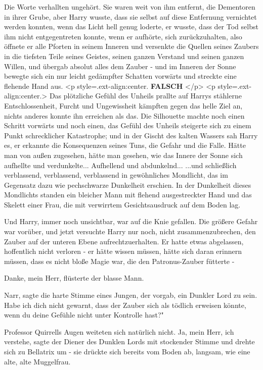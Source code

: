 Die Worte verhallten ungehört. Sie waren weit von ihm entfernt, die Dementoren
in ihrer Grube, aber Harry wusste, dass sie selbst auf diese Entfernung
vernichtet werden konnten, wenn das Licht hell genug loderte, er wusste, dass
der Tod selbst ihm nicht entgegentreten konnte, wenn er aufhörte, sich
zurückzuhalten, also öffnete er alle Pforten in seinem Inneren und versenkte die
Quellen seines Zaubers in die tiefsten Teile seines Geistes, seinen ganzen
Verstand und seinen ganzen Willen, und übergab absolut alles dem Zauber - und im
Inneren der Sonne bewegte sich ein nur leicht gedämpfter Schatten vorwärts und
streckte eine flehende Hand aus. <p style=\grqq{}.ext-align:center\grqq{}.
\textbf{FALSCH} </p> <p style=\grqq{}.ext-align:center\grqq{}.> Das plötzliche
Gefühl des Unheils prallte auf Harrys stählerne Entschlossenheit, Furcht und
Ungewissheit kämpften gegen das helle Ziel an, nichts anderes konnte ihn
erreichen als das. Die Silhouette machte noch einen Schritt vorwärts und noch
einen, das Gefühl des Unheils steigerte sich zu einem Punkt schrecklicher
Katastrophe; und in der Gischt des kalten Wassers sah Harry es, er erkannte die
Konsequenzen seines Tuns, die Gefahr und die Falle. Hätte man von außen
zugesehen, hätte man gesehen, wie das Innere der Sonne sich aufhellte und
verdunkelte... Aufhellend und abdunkelnd... ...und schließlich verblassend,
verblassend, verblassend in gewöhnliches Mondlicht, das im Gegensatz dazu wie
pechschwarze Dunkelheit erschien. In der Dunkelheit dieses Mondlichts standen
ein bleicher Mann mit flehend ausgestreckter Hand und das Skelett einer Frau,
die mit verwirrtem Gesichtsausdruck auf dem Boden lag.

Und Harry, immer noch unsichtbar, war auf die Knie gefallen. Die größere Gefahr
war vorüber, und jetzt versuchte Harry nur noch, nicht zusammenzubrechen, den
Zauber auf der unteren Ebene aufrechtzuerhalten. Er hatte etwas abgelassen,
hoffentlich nicht verloren - er hätte wissen müssen, hätte sich daran erinnern
müssen, dass es nicht bloße Magie war, die den Patronus-Zauber fütterte -

\glqq{}Danke, mein Herr\grqq{}, flüsterte der blasse Mann.

\glqq{}Narr\grqq{}, sagte die harte Stimme eines Jungen, der vorgab, ein Dunkler
Lord zu sein. \glqq{}Habe ich dich nicht gewarnt, dass der Zauber sich als
tödlich erweisen könnte, wenn du deine Gefühle nicht unter Kontrolle hast?"

Professor Quirrells Augen weiteten sich natürlich nicht. \glqq{}Ja, mein Herr,
ich verstehe\grqq{}, sagte der Diener des Dunklen Lords mit stockender Stimme
und drehte sich zu Bellatrix um - sie drückte sich bereits vom Boden ab,
langsam, wie eine alte, alte Muggelfrau.

